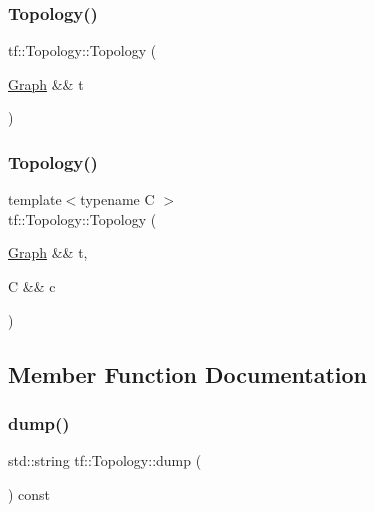 \subsubsection{\texorpdfstring{Topology()}{Topology()}\hspace{0.1cm}{\footnotesize\ttfamily [1/2]}}
{\footnotesize\ttfamily tf\+::\+Topology\+::\+Topology (\begin{DoxyParamCaption}\item[{\hyperlink{namespacetf_a2afa7da139285640eaf8122535136dc9}{Graph} \&\&}]{t }\end{DoxyParamCaption})\hspace{0.3cm}{\ttfamily [inline]}}

\mbox{\label{classtf_1_1Topology_a303fa5fb107070ac5180841c0811cfae}} 
\subsubsection{\texorpdfstring{Topology()}{Topology()}\hspace{0.1cm}{\footnotesize\ttfamily [2/2]}}
{\footnotesize\ttfamily template$<$typename C $>$ \\
tf\+::\+Topology\+::\+Topology (\begin{DoxyParamCaption}\item[{\hyperlink{namespacetf_a2afa7da139285640eaf8122535136dc9}{Graph} \&\&}]{t,  }\item[{C \&\&}]{c }\end{DoxyParamCaption})\hspace{0.3cm}{\ttfamily [inline]}}



\subsection{Member Function Documentation}
\mbox{\label{classtf_1_1Topology_a83242ca6b464589d405b9450a418f8ff}} 
\subsubsection{\texorpdfstring{dump()}{dump()}\hspace{0.1cm}{\footnotesize\ttfamily [1/2]}}
{\footnotesize\ttfamily std\+::string tf\+::\+Topology\+::dump (\begin{DoxyParamCaption}{ }\end{DoxyParamCaption}) const\hspace{0.3cm}{\ttfamily [inline]}}

